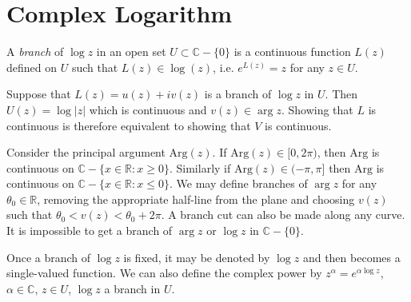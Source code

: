 \section{Complex Logarithm}

\begin{defn}[Branch]
  A \emph{branch} of $\log z$ in an open set
  $U \subset \mathbb{C} - \{ 0 \}$ is a continuous function
  $L(z)$ defined on $U$ such that $L(z) \in \log(z)$, i.e.
  $e^{L(z)} = z$ for any $z \in U$.
\end{defn}

Suppose that $L(z) = u(z) + i v(z)$ is a branch of $\log z$ in $U$.
Then $U(z) = \log |z|$ which is continuous and
$v(z) \in \arg z$. Showing that $L$ is continuous is therefore
equivalent to showing that $V$ is continuous.

Consider the principal argument $\mathrm{Arg}(z)$. If
$\mathrm{Arg}(z) \in [0, 2\pi)$, then $\mathrm{Arg}$ is
continuous on $\mathbb{C} - \{ x \in \mathbb{R} : x \geq 0 \}$.
Similarly if $\mathrm{Arg}(z) \in (-\pi, \pi]$ then $\mathrm{Arg}$
is continuous on $\mathbb{C} - \{ x \in \mathbb{R} : x \leq 0 \}$.
We may define branches of $\arg z$ for any $\theta_0 \in \mathbb{R}$,
removing the appropriate half-line from the plane and choosing
$v(z)$ such that $\theta_0 < v(z) < \theta_0 + 2 \pi$.
A branch cut can also be made along any curve. It is impossible
to get a branch of $\arg z$ or $\log z$ in $\mathbb{C} - \{ 0 \}$.

Once a branch of $\log z$ is fixed, it may be denoted by $\log z$
and then becomes a single-valued function. We can also define the
complex power by $z^\alpha = e^{\alpha \log z}$, $\alpha \in \mathbb{C}$,
$z \in U$, $\log z$ a branch in $U$.
